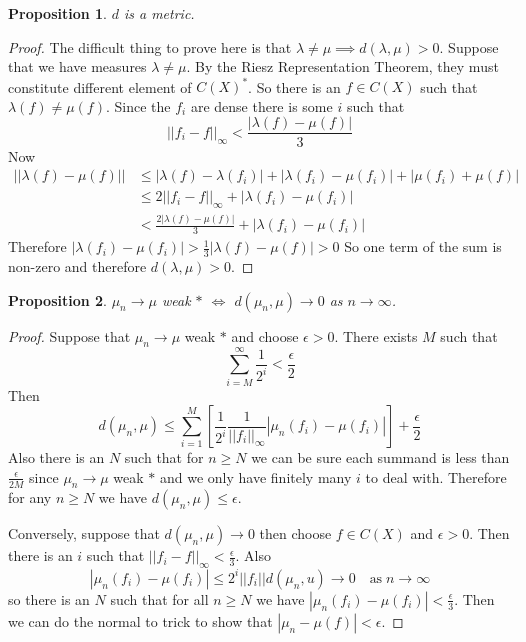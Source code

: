 \documentclass[11pt]{article}
\newcommand{\abs}[1]{\left|#1\right|}
\newcommand{\norm}[1]{\left|\left|#1\right|\right|}
\newtheorem{prop}{Proposition}[section]
\begin{document}
\begin{prop}
$d$ is a metric.
\end{prop}

\begin{proof}
The difficult thing to prove here is that $\lambda \neq \mu \implies d(\lambda, \mu ) > 0$.
Suppose that we have measures $\lambda \neq \mu$.
By the Riesz Representation Theorem, they must constitute different element of $C(X)^\ast$.
So there is an $f\in C(X)$ such that $\lambda(f)\neq \mu(f)$.
Since the $f_i$ are dense there is some $i$ such that
\[
	\norm{f_i-f}_\infty < \frac{\abs{\lambda(f)-\mu(f)}}{3}
\]
Now
\begin{align*}
	\norm{\lambda(f)-\mu(f)} & \leq \abs{\lambda(f) - \lambda(f_i)} + \abs{\lambda(f_i) - \mu(f_i)} + \abs{\mu(f_i) + \mu(f)} \\
							 & \leq 2 \norm{f_i - f}_\infty + \abs{\lambda(f_i) - \mu(f_i)}\\
							 & < \frac{2\abs{\lambda(f) - \mu(f)}}{3} + \abs{\lambda(f_i) - \mu(f_i)}
\end{align*}
Therefore $\abs{\lambda(f_i)- \mu(f_i)} > \frac{1}{3}\abs{\lambda(f) - \mu(f)} > 0$
So one term of the sum is non-zero and therefore $d(\lambda, \mu) >0$.
\end{proof}

\begin{prop}
$\mu_n \to \mu$ weak $\ast$ $\iff$ $d(\mu_n, \mu)\to 0$ as $n\to\infty$.
\end{prop}

\begin{proof}
Suppose that $\mu_n \to \mu$ weak $\ast$ and choose $\epsilon > 0$.
There exists $M$ such that
\[
	\sum_{i=M}^\infty\frac{1}{2^i}< \frac{\epsilon}{2}
\]
Then 
\[
	d(\mu_n, \mu) \leq \sum_{i=1}^{M}\left[ \frac{1}{2^i}\frac{1}{\norm{f_i}_\infty}\abs{\mu_n(f_i) - \mu(f_i)}\right] + \frac{\epsilon}{2}
\]
Also there is an $N$ such that for $n\geq N$ we can be sure each summand is less than $\frac{\epsilon}{2M}$ since $\mu_n\to \mu$ weak $\ast$ and we only have finitely many $i$ to deal with.
Therefore for any $n\geq N$ we have $d(\mu_n , \mu) \leq \epsilon$.

Conversely, suppose that $d(\mu_n, \mu)\to 0$ then choose $f\in C(X)$ and $\epsilon >0$.
Then there is an $i$ such that $\norm{f_i -f}_\infty < \frac{\epsilon}{3}$.
Also
\[
	\abs{\mu_n(f_i)-\mu(f_i)}\leq 2^i\norm{f_i}d(\mu_n, u) \to 0 \quad \text{as}\; n\to\infty
\]
so there is an $N$ such that for all $n\geq N$ we have $\abs{\mu_n(f_i) - \mu(f_i)} < \frac{\epsilon}{3}$.
Then we can do the normal to trick to show that $\abs{\mu_n - \mu(f)}< \epsilon$.
\end{proof}
\end{document}
